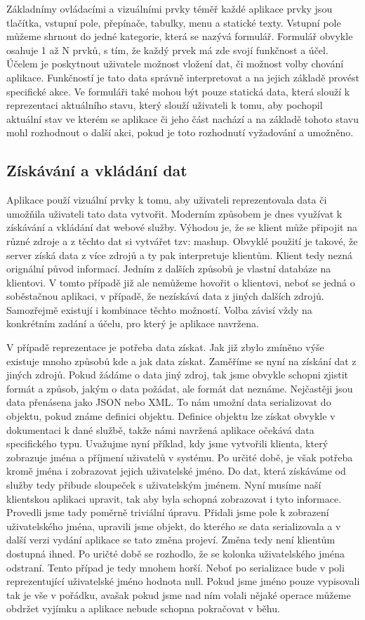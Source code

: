 Základnímy ovládacími a vizuálními prvky téměř každé aplikace prvky jsou tlačítka, vstupní pole, přepínače, tabulky, menu a statické texty. Vstupní pole můžeme shrnout do jedné kategorie, která se nazývá formulář. Formulář obvykle osahuje 1 až N prvků, s tím, že každý prvek má zde svojí funkčnost a účel. Účelem je poskytnout uživatele možnost vložení dat, či možnost volby chování aplikace. Funkčností je tato data správně interpretovat a na jejich základě provést specifické akce. Ve formuláři také mohou být pouze statická data, která slouží k reprezentaci aktuálního stavu, který slouží uživateli k tomu, aby pochopil aktuální stav ve kterém se aplikace či jeho část nachází a na základě tohoto stavu mohl rozhodnout o další akci, pokud je toto rozhodnutí vyžadování a umožněno.
\subsection{Získávání a vkládání dat}
Aplikace použí vizuální prvky k tomu, aby uživateli reprezentovala data či umožňila uživateli tato data vytvořit. Moderním způsobem je dnes využívat k získávání a vkládání dat webové služby. Výhodou je, že se klient může připojit na různé zdroje a z těchto dat si vytvářet tzv: mashup. Obvyklé použití je takové, že server získá data z více zdrojů a ty pak interpretuje klientům. Klient tedy nezná orignální původ informací. Jedním z dalších způsobů je vlastní databáze na klientovi. V tomto případě již ale nemůžeme hovořit o klientovi, neboť se jedná o soběstačnou aplikaci, v případě, že nezískává data z jiných dalších zdrojů. Samozřejmě existují i kombinace těchto možností. Volba závisí vždy na konkrétním zadání a účelu, pro který je aplikace navržena.

V případě reprezentace je potřeba data získat. Jak již zbylo zmíněno výše existuje mnoho způsobů kde a jak data získat. Zaměříme se nyní na získání dat z jiných zdrojů. Pokud žádáme o data jiný zdroj, tak jsme obvykle schopni zjistit formát a způsob, jakým o data požádat, ale formát dat neznáme. Nejčastěji jsou data přenásena jako JSON nebo XML. To nám umožní data serializovat do objektu, pokud známe definici objektu. Definice objektu lze získat obvykle v dokumentaci k dané službě, takže námi navržená aplikace očekává data specifického typu. Uvažujme nyní příklad, kdy jsme vytvořili klienta, který zobrazuje jména a příjmení uživatelů v systému. Po určité době, je však potřeba kromě jména i zobrazovat jejich uživatelské jméno. Do dat, která získáváme od služby tedy přibude sloupeček s uživatelským jménem. Nyní musíme naší klientskou aplikaci upravit, tak aby byla schopná zobrazovat i tyto informace. Provedli jsme tady poměrně triviální úpravu. Přidali jsme pole k zobrazení uživatelského jména, upravili jsme objekt, do kterého se data serializovala a v další verzi vydání aplikace se tato změna projeví. Změna tedy není klientům dostupná ihned. Po uričté době se rozhodlo, že se kolonka uživatelského jména odstraní. Tento případ je tedy mnohem horší. Neboť po serializace bude v poli reprezentující uživatelské jméno hodnota null. Pokud jsme jméno pouze vypisovali tak je vše v pořádku, avašak pokud jsme nad ním volali nějaké operace můžeme obdržet vyjímku a aplikace nebude schopna pokračovat v běhu.

